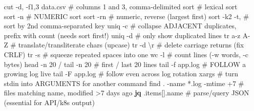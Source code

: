 \documentclass[11pt]{article}
\newenvironment{Shaded}{\begin{snugshade}}{\end{snugshade}}
\newcommand{\AttributeTok}[1]{\textcolor[rgb]{0.16,0.50,0.73}{#1}}
\newcommand{\CommentTok}[1]{\textcolor[rgb]{0.48,0.49,0.49}{#1}}
\newcommand{\ExtensionTok}[1]{\textcolor[rgb]{0.00,0.60,1.00}{\textbf{#1}}}
\newcommand{\FunctionTok}[1]{\textcolor[rgb]{0.56,0.27,0.68}{#1}}
\newcommand{\NormalTok}[1]{\textcolor[rgb]{0.81,0.81,0.76}{#1}}
\newcommand{\StringTok}[1]{\textcolor[rgb]{0.96,0.31,0.31}{#1}}
\begin{document}

\begin{Shaded}
\begin{Highlighting}[]
\FunctionTok{cut} \AttributeTok{{-}d,} \AttributeTok{{-}f1,3}\NormalTok{ data.csv         }\CommentTok{\# columns 1 and 3, comma{-}delimited}
\FunctionTok{sort}                           \CommentTok{\# lexical sort}
\FunctionTok{sort} \AttributeTok{{-}n}                        \CommentTok{\# NUMERIC sort}
\FunctionTok{sort} \AttributeTok{{-}rn}                       \CommentTok{\# numeric, reverse (largest first)}
\FunctionTok{sort} \AttributeTok{{-}k2} \AttributeTok{{-}t,}                   \CommentTok{\# sort by 2nd comma{-}separated key}
\FunctionTok{uniq} \AttributeTok{{-}c}                        \CommentTok{\# collapse ADJACENT duplicates, prefix with count (needs sort first!)}
\FunctionTok{uniq} \AttributeTok{{-}d}                        \CommentTok{\# only show duplicated lines}
\FunctionTok{tr} \StringTok{\textquotesingle{}a{-}z\textquotesingle{}} \StringTok{\textquotesingle{}A{-}Z\textquotesingle{}}                 \CommentTok{\# translate/transliterate chars (upcase)}
\FunctionTok{tr} \AttributeTok{{-}d} \StringTok{\textquotesingle{}\textbackslash{}r\textquotesingle{}}                     \CommentTok{\# delete carriage returns (fix CRLF)}
\FunctionTok{tr} \AttributeTok{{-}s} \StringTok{\textquotesingle{} \textquotesingle{}}                      \CommentTok{\# squeeze repeated spaces into one}
\FunctionTok{wc} \AttributeTok{{-}l}                          \CommentTok{\# count lines  ({-}w words, {-}c bytes)}
\FunctionTok{head} \AttributeTok{{-}n}\NormalTok{ 20  /  tail }\AttributeTok{{-}n}\NormalTok{ 20      }\CommentTok{\# first / last 20 lines}
\FunctionTok{tail} \AttributeTok{{-}f}\NormalTok{ app.log                }\CommentTok{\# FOLLOW a growing log live}
\FunctionTok{tail} \AttributeTok{{-}F}\NormalTok{ app.log                }\CommentTok{\# follow even across log rotation}
\FunctionTok{xargs}                          \CommentTok{\# turn stdin into ARGUMENTS for another command}
\FunctionTok{find}\NormalTok{ . }\AttributeTok{{-}name} \StringTok{\textquotesingle{}*.log\textquotesingle{}} \AttributeTok{{-}mtime}\NormalTok{ +7 }\CommentTok{\# files matching name, modified \textgreater{}7 days ago}
\ExtensionTok{jq} \StringTok{\textquotesingle{}.items[].name\textquotesingle{}}             \CommentTok{\# parse/query JSON (essential for API/k8s output)}
\end{Highlighting}
\end{Shaded}
\end{document}
